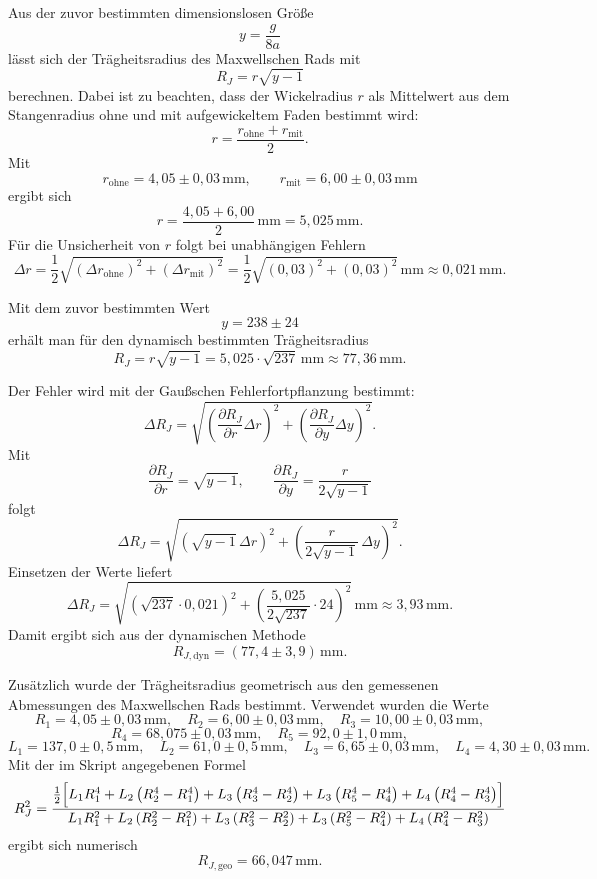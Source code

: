 \documentclass{report}
\begin{document}
\noindent
Aus der zuvor bestimmten dimensionslosen Größe
\[
y=\frac{g}{8a}
\]
lässt sich der Trägheitsradius des Maxwellschen Rads mit
\[
R_J=r\sqrt{y-1}
\]
berechnen. Dabei ist zu beachten, dass der Wickelradius \(r\) als Mittelwert aus dem Stangenradius ohne und mit aufgewickeltem Faden bestimmt wird:
\[
r=\frac{r_{\text{ohne}}+r_{\text{mit}}}{2}.
\]
Mit
\[
r_{\text{ohne}}=4{,}05\pm0{,}03\,\mathrm{mm},
\qquad
r_{\text{mit}}=6{,}00\pm0{,}03\,\mathrm{mm}
\]
ergibt sich
\[
r=\frac{4{,}05+6{,}00}{2}\,\mathrm{mm}=5{,}025\,\mathrm{mm}.
\]
Für die Unsicherheit von \(r\) folgt bei unabhängigen Fehlern
\[
\Delta r=\frac12\sqrt{(\Delta r_{\text{ohne}})^2+(\Delta r_{\text{mit}})^2}
=\frac12\sqrt{(0{,}03)^2+(0{,}03)^2}\,\mathrm{mm}
\approx 0{,}021\,\mathrm{mm}.
\]

\noindent
Mit dem zuvor bestimmten Wert
\[
y=238\pm24
\]
erhält man für den dynamisch bestimmten Trägheitsradius
\[
R_J=r\sqrt{y-1}
=5{,}025\cdot\sqrt{237}\,\mathrm{mm}
\approx 77{,}36\,\mathrm{mm}.
\]

\noindent
Der Fehler wird mit der Gaußschen Fehlerfortpflanzung bestimmt:
\[
\Delta R_J=
\sqrt{
\left(\frac{\partial R_J}{\partial r}\Delta r\right)^2+
\left(\frac{\partial R_J}{\partial y}\Delta y\right)^2
}.
\]
Mit
\[
\frac{\partial R_J}{\partial r}=\sqrt{y-1},
\qquad
\frac{\partial R_J}{\partial y}=\frac{r}{2\sqrt{y-1}}
\]
folgt
\[
\Delta R_J=
\sqrt{
\left(\sqrt{y-1}\,\Delta r\right)^2+
\left(\frac{r}{2\sqrt{y-1}}\,\Delta y\right)^2
}.
\]
Einsetzen der Werte liefert
\[
\Delta R_J=
\sqrt{
\left(\sqrt{237}\cdot 0{,}021\right)^2+
\left(\frac{5{,}025}{2\sqrt{237}}\cdot 24\right)^2
}\,\mathrm{mm}
\approx 3{,}93\,\mathrm{mm}.
\]
Damit ergibt sich aus der dynamischen Methode
\[
\boxed{R_{J,\mathrm{dyn}}=(77{,}4\pm3{,}9)\,\mathrm{mm}.}
\]

\bigskip

\noindent
Zusätzlich wurde der Trägheitsradius geometrisch aus den gemessenen Abmessungen des Maxwellschen Rads bestimmt. Verwendet wurden die Werte
\[
R_1=4{,}05\pm0{,}03\,\mathrm{mm},\quad
R_2=6{,}00\pm0{,}03\,\mathrm{mm},\quad
R_3=10{,}00\pm0{,}03\,\mathrm{mm},
\]
\[
R_4=68{,}075\pm0{,}03\,\mathrm{mm},\quad
R_5=92{,}0\pm1{,}0\,\mathrm{mm},
\]
\[
L_1=137{,}0\pm0{,}5\,\mathrm{mm},\quad
L_2=61{,}0\pm0{,}5\,\mathrm{mm},\quad
L_3=6{,}65\pm0{,}03\,\mathrm{mm},\quad
L_4=4{,}30\pm0{,}03\,\mathrm{mm}.
\]
Mit der im Skript angegebenen Formel
\[
R_J^2=
\frac{
\frac12\Bigl[
L_1R_1^4
+L_2\left(R_2^4-R_1^4\right)
+L_3\left(R_3^4-R_2^4\right)
+L_3\left(R_5^4-R_4^4\right)
+L_4\left(R_4^4-R_3^4\right)
\Bigr]
}{
L_1R_1^2
+L_2\left(R_2^2-R_1^2\right)
+L_3\left(R_3^2-R_2^2\right)
+L_3\left(R_5^2-R_4^2\right)
+L_4\left(R_4^2-R_3^2\right)
}
\]
ergibt sich numerisch
\[
R_{J,\mathrm{geo}}=66{,}047\,\mathrm{mm}.
\]
\end{document}
